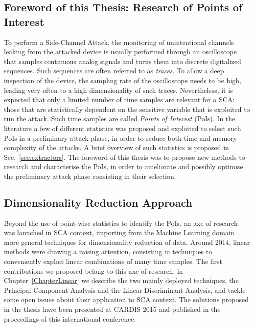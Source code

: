 \subsection{Foreword of this Thesis: Research of Points of Interest}\label{sec:foreword}
To perform a Side-Channel Attack, the monitoring of unintentional channels leaking from the attacked device is usually performed through an oscilloscope that samples continuous analog signals and turns them into discrete digitalized sequences. Such sequences are often referred to as \emph{traces}. To allow a deep inspection of the device, the sampling rate of the oscilloscope needs to be high, leading very often to a high dimensionality of such traces. Nevertheless,  it is expected that only a limited number of time samples are relevant for a SCA: those that are statistically dependent on the sensitive variable that is exploited to run the attack. Such time samples are called \emph{Points of Interest} (PoIs). In the literature a few of different statistics was proposed and exploited to select such PoIs in a preliminary attack phase, in order to reduce both time and memory complexity of the attacks. A brief overview of such statistics is proposed in Sec.~\ref{sec:extractors}. The foreword of this thesis was to propose new methods to research and characterise the PoIs, in order to ameliorate and possibly optimise the preliminary attack phase consisting in their selection. 

\subsection{Dimensionality Reduction Approach}\label{sec:dim_red_objective}
Beyond the use of point-wise statistics to identify the PoIs, an axe of research was launched in SCA context, importing from the Machine Learning domain more general techniques for dimensionality reduction of data. Around 2014, linear methods were drawing a raising attention, consisting in techniques to conveniently exploit linear combinations of many time samples. The first contributions we proposed belong to this axe of research: in Chapter~\ref{ChapterLinear} we describe the two mainly deployed techniques, the Principal Component Analysis and the Linear Discriminant Analysis, and tackle some open issues about their application to SCA context. The solutions proposed in the thesis have been presented at CARDIS 2015 \cite{cagli2015enhancing} and published in the proceedings of this international conference.\\

